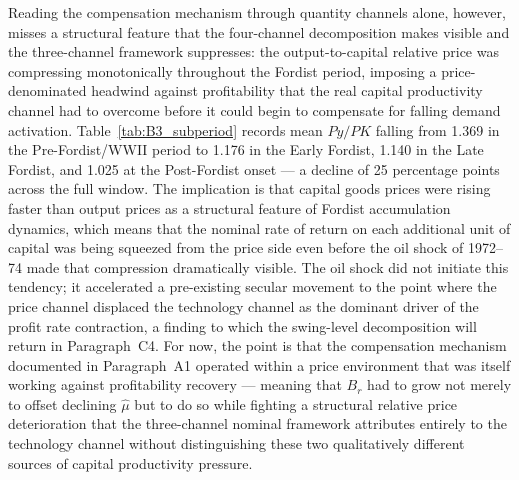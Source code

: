 Reading the compensation mechanism through quantity channels alone,
however, misses a structural feature that the four-channel decomposition
makes visible and the three-channel framework suppresses: the
output-to-capital relative price was compressing monotonically throughout
the Fordist period, imposing a price-denominated headwind against
profitability that the real capital productivity channel had to overcome
before it could begin to compensate for falling demand activation.
Table~\ref{tab:B3_subperiod} records mean $Py/PK$ falling from 1.369 in
the Pre-Fordist/WWII period to 1.176 in the Early Fordist, 1.140 in the
Late Fordist, and 1.025 at the Post-Fordist onset --- a decline of 25
percentage points across the full window. The implication is that capital
goods prices were rising faster than output prices as a structural feature
of Fordist accumulation dynamics, which means that the nominal rate of
return on each additional unit of capital was being squeezed from the
price side even before the oil shock of 1972--74 made that compression
dramatically visible. The oil shock did not initiate this tendency; it
accelerated a pre-existing secular movement to the point where the price
channel displaced the technology channel as the dominant driver of the
profit rate contraction, a finding to which the swing-level decomposition
will return in Paragraph~C4. For now, the point is that the compensation
mechanism documented in Paragraph~A1 operated within a price environment
that was itself working against profitability recovery --- meaning that
$B_{r}$ had to grow not merely to offset declining $\hat{\mu}$ but to do
so while fighting a structural relative price deterioration that the
three-channel nominal framework attributes entirely to the technology
channel without distinguishing these two qualitatively different sources
of capital productivity pressure.


